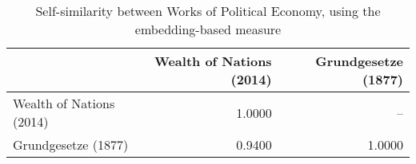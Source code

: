 \begin{table}[ht!]
\centering
\caption{Self-similarity between Works of Political Economy, using the embedding-based measure}
\label{tab:peself}
\begin{tabular}{lrr}
\toprule
{} &  Wealth of Nations (2014) &  Grundgesetze (1877) \\
\midrule
Wealth of Nations (2014) &                    1.0000 &                   -- \\
Grundgesetze (1877)      &                    0.9400 &               1.0000 \\
\bottomrule
\end{tabular}
\end{table}
